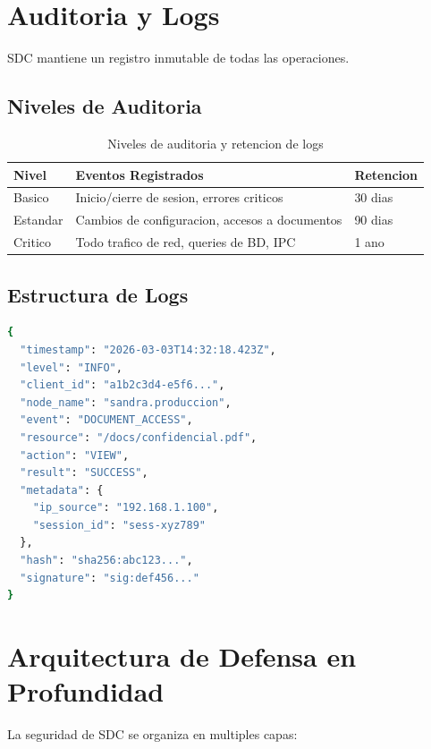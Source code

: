 \section{Auditoria y Logs}
\label{sec:auditoria}

SDC mantiene un registro inmutable de todas las operaciones.

\subsection{Niveles de Auditoria}

\begin{table}[H]
\centering
\begin{tabular}{p{3cm}p{4cm}p{6cm}}
\toprule
\textbf{Nivel} & \textbf{Eventos Registrados} & \textbf{Retencion} \\
\midrule
Basico & Inicio/cierre de sesion, errores criticos & 30 dias \\
\midrule
Estandar & Cambios de configuracion, accesos a documentos & 90 dias \\
\midrule
Critico & Todo trafico de red, queries de BD, IPC & 1 ano \\
\bottomrule
\end{tabular}
\caption{Niveles de auditoria y retencion de logs}
\label{tab:niveles-auditoria}
\end{table}

\subsection{Estructura de Logs}

\begin{lstlisting}[language=bash, caption={Formato de Log de Auditoria}]
{
  "timestamp": "2026-03-03T14:32:18.423Z",
  "level": "INFO",
  "client_id": "a1b2c3d4-e5f6...",
  "node_name": "sandra.produccion",
  "event": "DOCUMENT_ACCESS",
  "resource": "/docs/confidencial.pdf",
  "action": "VIEW",
  "result": "SUCCESS",
  "metadata": {
    "ip_source": "192.168.1.100",
    "session_id": "sess-xyz789"
  },
  "hash": "sha256:abc123...",
  "signature": "sig:def456..."
}
\end{lstlisting}

\section{Arquitectura de Defensa en Profundidad}

La seguridad de SDC se organiza en multiples capas:

